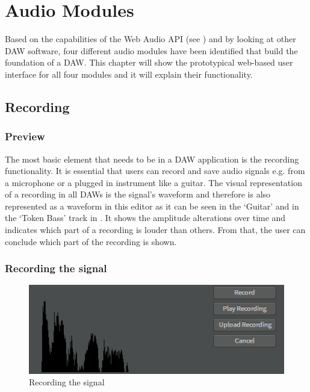 \section{Audio Modules}
\label{concept-modules}

Based on the capabilities of the Web Audio API (see ) and by looking at other DAW software, four different audio modules have been identified that build the foundation of a DAW. This chapter will show the prototypical web-based user interface for all four modules and it will explain their functionality.

\subsection{Recording}
\label{concept-recording}

\subsubsection{Preview}
\label{subsub:recording-preview}

The most basic element that needs to be in a DAW application is the recording functionality. It is essential that users can record and save audio signals e.g. from a microphone or a plugged in instrument like a guitar. The visual representation of a recording in all DAWs is the signal's waveform and therefore is also represented as a waveform in this editor as it can be seen in the `Guitar' and in the `Token Bass' track in . It shows the amplitude alterations over time and indicates which part of a recording is louder than others. From that, the user can conclude which part of the recording is shown.

\subsubsection{Recording the signal}
\label{subsub:recording-ui}

\begin{figure}[htb]
  \centerline{\includegraphics[width=\linewidth]{images/recording-a-signal.png}}
  \caption[Recording the signal]{Recording the signal}
  \label{fig:editor-recording-a-signal}
\end{figure}

